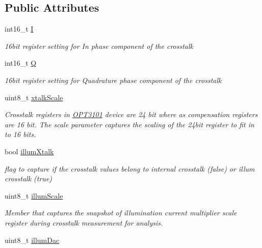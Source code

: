 \subsection*{Public Attributes}
\begin{DoxyCompactItemize}
\item 
int16\+\_\+t \mbox{\hyperlink{class_o_p_t3101_1_1crosstalk_c_a97152b209288a0dc30c4158fdc1815fc}{I}}
\begin{DoxyCompactList}\small\item\em 16bit register setting for In phase component of the crosstalk \end{DoxyCompactList}\item 
int16\+\_\+t \mbox{\hyperlink{class_o_p_t3101_1_1crosstalk_c_a1e20d913baf2432ec90fe06a45c226db}{Q}}
\begin{DoxyCompactList}\small\item\em 16bit register setting for Quadrature phase component of the crosstalk \end{DoxyCompactList}\item 
uint8\+\_\+t \mbox{\hyperlink{class_o_p_t3101_1_1crosstalk_c_a5a5c560e1f5db427c02863a9618d9fa4}{xtalk\+Scale}}
\begin{DoxyCompactList}\small\item\em Crosstalk registers in \mbox{\hyperlink{namespace_o_p_t3101}{O\+P\+T3101}} device are 24 bit where as compensation registers are 16 bit. The scale parameter captures the scaling of the 24bit register to fit in to 16 bits. \end{DoxyCompactList}\item 
bool \mbox{\hyperlink{class_o_p_t3101_1_1crosstalk_c_a74d3bfbfb7da65511d2d16e1b66a7098}{illum\+Xtalk}}
\begin{DoxyCompactList}\small\item\em flag to capture if the crosstalk values belong to internal crosstalk (false) or illum crosstalk (true) \end{DoxyCompactList}\item 
uint8\+\_\+t \mbox{\hyperlink{class_o_p_t3101_1_1crosstalk_c_aa9790b90a4d30f9459ef30c2ffcb0f15}{illum\+Scale}}
\begin{DoxyCompactList}\small\item\em Member that captures the snapshot of illumination current multiplier scale register during crosstalk measurement for analysis. \end{DoxyCompactList}\item 
uint8\+\_\+t \mbox{\hyperlink{class_o_p_t3101_1_1crosstalk_c_a926366d3812a768269de408d4205bdec}{illum\+Dac}}

\end{DoxyCompactItemize}
